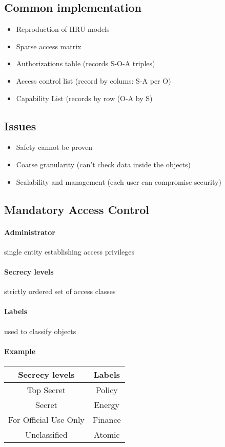 \documentclass{article}
\begin{document}
\subsection{Common implementation}
\begin{itemize}
\item Reproduction of HRU models
\item Sparse access matrix
\item Authorizations table (records S-O-A triples)
\item Access control list (record by colums: S-A per O)
\item Capability List (records by row (O-A by S)
\end{itemize}
\subsection{Issues}
\begin{itemize}
\item Safety cannot be proven
\item Coarse granularity (can't check data inside the objects)
\item Scalability and management (each user can compromise security)
\end{itemize}
\subsection{Mandatory Access Control}
\paragraph{Administrator} single entity establishing access privileges
\paragraph{Secrecy levels} strictly ordered set of access classes
\paragraph{Labels} used to classify objects
\paragraph{Example}
\begin{tabular}{|c|c|}
\textbf{Secrecy levels}&
\textbf{Labels}\\
\hline
Top Secret&Policy\\
Secret&Energy\\
For Official Use Only&Finance\\
Unclassified&Atomic
\end{tabular}
\end{document}
